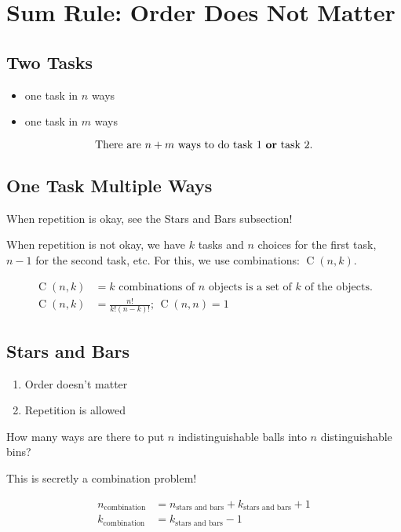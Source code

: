 \documentclass{report}
\DeclareMathOperator{\comb}{C}
\begin{document}
\section{Sum Rule: Order Does Not Matter}

\subsection{Two Tasks}
\begin{itemize}
    \item one task in $n$ ways
    \item one task in $m$ ways
\end{itemize}

\begin{equation}
    \text{There are } n + m \text{ ways to do task 1 \textbf{or} task 2.}
\end{equation}

\subsection{One Task Multiple Ways}
When repetition is okay, see the Stars and Bars subsection!

When repetition is not okay, we have $k$ tasks and $n$ choices for the first task, $n-1$ for the second task, etc. For this, we use combinations: $\comb(n, k)$.

\begin{align}
    \text{$\comb(n, k)$} &= \text{$k$ combinations of $n$ objects is a set of $k$ of the objects.} \\
    \comb(n, k) &= \frac{n!}{k!(n-k)!} \text{; } \comb(n, n) = 1
\end{align}

\subsection{Stars and Bars}

\begin{enumerate}
    \item Order doesn't matter
    \item Repetition is allowed
\end{enumerate}

How many ways are there to put $n$ indistinguishable balls into $n$ distinguishable bins?

This is secretly a combination problem! 

\begin{align}
    n_{\text{combination}} &= n_{\text{stars and bars}} + k_{\text{stars and bars}} + 1 \\
    k_{\text{combination}} &= k_{\text{stars and bars}} -1
\end{align}
\end{document}
